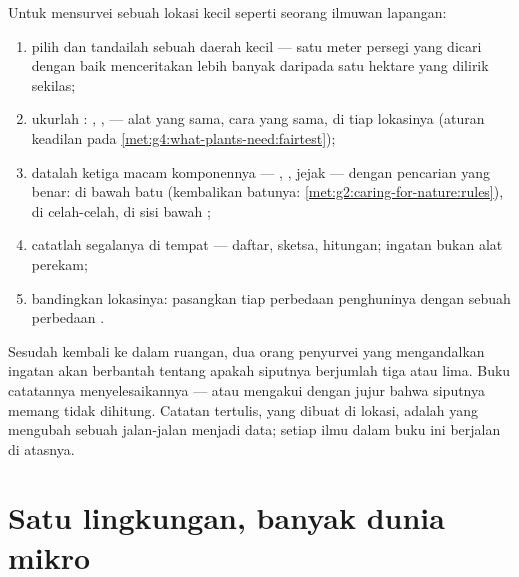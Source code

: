 \begin{method}\label{met:g6:exploring-our-environment:survey}
Untuk mensurvei sebuah lokasi kecil seperti seorang ilmuwan lapangan:
\begin{enumerate}
  \item pilih dan tandailah sebuah daerah kecil --- satu meter persegi
        yang dicari dengan baik menceritakan lebih banyak daripada
        satu hektare yang dilirik sekilas;
  \item ukurlah : , ,  --- alat yang
        sama, cara yang sama, di tiap lokasinya
        (aturan keadilan pada
        \cref{met:g4:what-plants-need:fairtest});
  \item datalah ketiga macam komponennya --- , , jejak --- dengan pencarian yang benar: di bawah batu
        (kembalikan batunya:
        \cref{met:g2:caring-for-nature:rules}), di celah-celah, di
        sisi bawah ;
  \item catatlah segalanya di tempat --- daftar, sketsa, hitungan;
        ingatan bukan alat perekam;
  \item bandingkan lokasinya: pasangkan tiap perbedaan penghuninya
        dengan sebuah perbedaan .
\end{enumerate}
\end{method}

\begin{remark}\label{rem:g6:exploring-our-environment:records}
Sesudah kembali ke dalam ruangan, dua orang penyurvei yang
mengandalkan ingatan akan berbantah tentang apakah siputnya berjumlah
tiga atau lima. Buku catatannya menyelesaikannya --- atau mengakui
dengan jujur bahwa siputnya memang tidak dihitung. Catatan tertulis,
yang dibuat di lokasi, adalah yang mengubah sebuah jalan-jalan menjadi
data; setiap ilmu dalam buku ini berjalan di atasnya.
\end{remark}

\section{Satu lingkungan, banyak dunia mikro}

